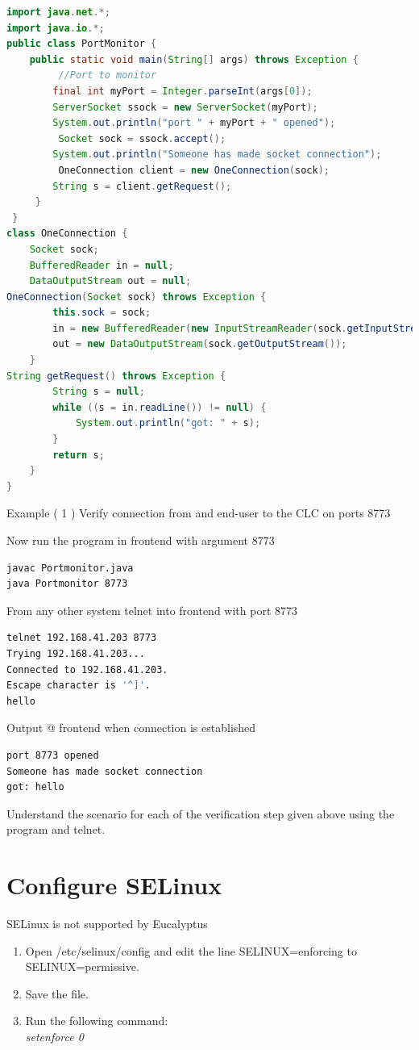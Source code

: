 \begin{lstlisting}[language=java]
import java.net.*;
import java.io.*;
public class PortMonitor {
    public static void main(String[] args) throws Exception {
         //Port to monitor
        final int myPort = Integer.parseInt(args[0]);
        ServerSocket ssock = new ServerSocket(myPort);
        System.out.println("port " + myPort + " opened");
         Socket sock = ssock.accept();
        System.out.println("Someone has made socket connection");
         OneConnection client = new OneConnection(sock);
        String s = client.getRequest();
     }
 }
class OneConnection {
    Socket sock;
    BufferedReader in = null;
    DataOutputStream out = null;
OneConnection(Socket sock) throws Exception {
        this.sock = sock;
        in = new BufferedReader(new InputStreamReader(sock.getInputStream()));
        out = new DataOutputStream(sock.getOutputStream());
    }
String getRequest() throws Exception {
        String s = null;
        while ((s = in.readLine()) != null) {
            System.out.println("got: " + s);
        }
        return s;
    }
}
\end{lstlisting}
Example 
( 1 ) Verify connection from and end-user to the CLC on ports 8773

Now run the program in frontend with argument 8773
\begin{lstlisting}[language=bash]
javac Portmonitor.java
java Portmonitor 8773
\end{lstlisting}
From any other system telnet into frontend with port 8773
\begin{lstlisting}[language=bash]
telnet 192.168.41.203 8773
Trying 192.168.41.203...
Connected to 192.168.41.203.
Escape character is '^]'.
hello
\end{lstlisting}
Output @ frontend when connection is established 
\begin{lstlisting}[language=bash]
port 8773 opened
Someone has made socket connection
got: hello
\end{lstlisting}
Understand the scenario for each of the verification step given above using the program and telnet.

\section{Configure SELinux}
SELinux is not supported by Eucalyptus
\begin{enumerate}
\item Open /etc/selinux/config and edit the line SELINUX=enforcing to SELINUX=permissive.
\item Save the file.
\item Run the following command: \\
\em{setenforce 0}
\end{enumerate}
